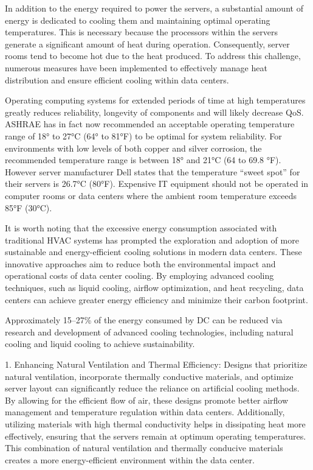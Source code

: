 \documentclass[
  a4paper,  %
  twoside,  %
  bibliography=totoc,
  headsepline,
  cleardoublepage=empty,
  parskip=half,
  draft=false
]{scrbook}
\begin{document}
In addition to the energy required to power the servers, a substantial amount of energy is dedicated to cooling them and maintaining optimal operating temperatures. This is necessary because the processors within the servers generate a significant amount of heat during operation. Consequently, server rooms tend to become hot due to the heat produced. To address this challenge, numerous measures have been implemented to effectively manage heat distribution and ensure efficient cooling within data centers.

Operating computing systems for extended periods of time at high temperatures
greatly reduces reliability, longevity of components and will likely decrease QoS. ASHRAE has in fact now recommended an acceptable operating temperature range of 18° to 27°C (64° to 81°F) to be optimal for system reliability. For environments with low levels of both copper and silver corrosion, the recommended temperature range is between 18° and 21°C (64 to 69.8 °F). However server manufacturer Dell states that the temperature “sweet spot” for their servers is 26.7°C (80°F)\cite{AVTECH}. Expensive IT equipment should not be operated in computer rooms or data centers where the ambient room temperature exceeds 85°F (30°C)\cite{42U_2016}.

It is worth noting that the excessive energy consumption associated with traditional HVAC systems has prompted the exploration and adoption of more sustainable and energy-efficient cooling solutions in modern data centers. These innovative approaches aim to reduce both the environmental impact and operational costs of data center cooling. By employing advanced cooling techniques, such as liquid cooling, airflow optimization, and heat recycling, data centers can achieve greater energy efficiency and minimize their carbon footprint.

Approximately 15–27\% of the energy consumed by DC can be reduced via research and development of advanced cooling technologies, including natural cooling and liquid cooling to achieve sustainability.



1. Enhancing Natural Ventilation and Thermal Efficiency:
Designs that prioritize natural ventilation, incorporate thermally conductive materials, and optimize server layout can significantly reduce the reliance on artificial cooling methods. By allowing for the efficient flow of air, these designs promote better airflow management and temperature regulation within data centers. Additionally, utilizing materials with high thermal conductivity helps in dissipating heat more effectively, ensuring that the servers remain at optimum operating temperatures. This combination of natural ventilation and thermally conducive materials creates a more energy-efficient environment within the data center.
\end{document}
